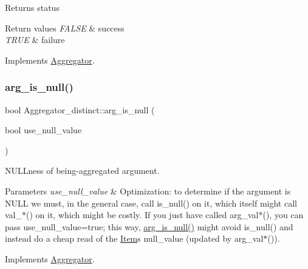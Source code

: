 \begin{DoxyReturn}{Returns}
status 
\end{DoxyReturn}

\begin{DoxyRetVals}{Return values}
{\em F\+A\+L\+SE} & success \\
\hline
{\em T\+R\+UE} & failure \\
\hline
\end{DoxyRetVals}


Implements \mbox{\hyperlink{classAggregator_a70e0d53834f2672f3ec57c96e35a9a60}{Aggregator}}.

\mbox{\label{classAggregator__distinct_a213b0657e2fcd03305629d78c68b31ad}} 
\subsubsection{\texorpdfstring{arg\+\_\+is\+\_\+null()}{arg\_is\_null()}}
{\footnotesize\ttfamily bool Aggregator\+\_\+distinct\+::arg\+\_\+is\+\_\+null (\begin{DoxyParamCaption}\item[{bool}]{use\+\_\+null\+\_\+value }\end{DoxyParamCaption})\hspace{0.3cm}{\ttfamily [virtual]}}

N\+U\+L\+Lness of being-\/aggregated argument.


\begin{DoxyParams}{Parameters}
{\em use\+\_\+null\+\_\+value} & Optimization\+: to determine if the argument is N\+U\+LL we must, in the general case, call is\+\_\+null() on it, which itself might call val\+\_\+$\ast$() on it, which might be costly. If you just have called arg\+\_\+val$\ast$(), you can pass use\+\_\+null\+\_\+value=true; this way, \mbox{\hyperlink{classAggregator__distinct_a213b0657e2fcd03305629d78c68b31ad}{arg\+\_\+is\+\_\+null()}} might avoid is\+\_\+null() and instead do a cheap read of the \mbox{\hyperlink{classItem}{Item}}\textquotesingle{}s null\+\_\+value (updated by arg\+\_\+val$\ast$()). \\
\hline
\end{DoxyParams}


Implements \mbox{\hyperlink{classAggregator_a2581c04dee61cf1a4d72519da64baf53}{Aggregator}}.

